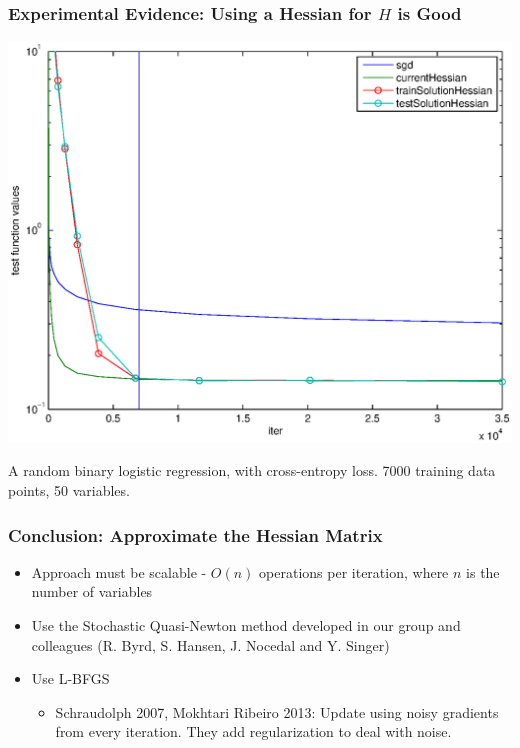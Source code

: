 \documentclass{beamer}
\begin{document}
\begin{frame}
	\frametitle{Experimental Evidence: Using a Hessian for $H$ is Good}
		\begin{center}
				\includegraphics[scale=0.4]{figures/P0.eps}
		\end{center}	
		A random binary logistic regression, with cross-entropy loss. 7000 training data points, 50 variables.
\end{frame}

\begin{frame}
	\frametitle{Conclusion: Approximate the Hessian Matrix}
	\begin{itemize}
		\pause
		\item Approach must be scalable - $O(n)$ operations per iteration, where $n$ is the number of variables
		\pause
		\item Use the Stochastic Quasi-Newton method developed in our group and colleagues (R. Byrd, S. Hansen, J. Nocedal and Y. Singer)
		\pause
		\item Use L-BFGS
		\begin{itemize}
			\item Schraudolph 2007, Mokhtari Ribeiro 2013: Update using noisy gradients from every iteration. They add regularization to deal with noise.
		\end{itemize}
 	\end{itemize}
\end{frame}
\end{document}
